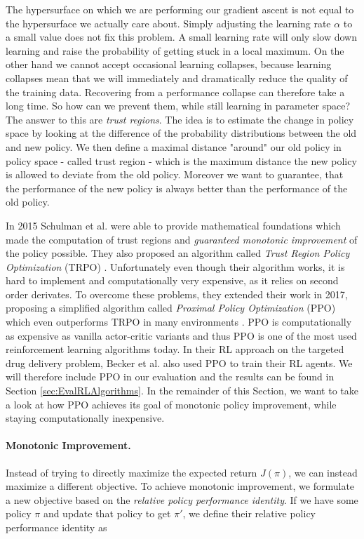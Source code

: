 The hypersurface on which we are performing our gradient ascent is not equal to the hypersurface we actually care about. Simply adjusting the learning rate $\alpha$ to a small value does not fix this problem. A small learning rate will only slow down learning and raise the probability of getting stuck in a local maximum. On the other hand we cannot accept occasional learning collapses, because learning collapses mean that we will immediately and dramatically reduce the quality of the training data. Recovering from a performance collapse can therefore take a long time. So how can we prevent them, while still learning in parameter space? The answer to this are \textit{trust regions}. The idea is to estimate the change in policy space by looking at the difference of the probability distributions between the old and new policy. We then define a maximal distance "around" our old policy in policy space - called trust region - which is the maximum distance the new policy is allowed to deviate from the old policy. Moreover we want to guarantee, that the performance of the new policy is always better than the performance of the old policy.

In 2015 Schulman et al. were able to provide mathematical foundations which made the computation of trust regions and \textit{guaranteed monotonic improvement} of the policy possible. They also proposed an algorithm called \textit{Trust Region Policy Optimization} (TRPO) \cite{schulman2015trust}. Unfortunately even though their algorithm works, it is hard to implement and computationally very expensive, as it relies on second order derivates. To overcome these problems, they extended their work in 2017, proposing a simplified algorithm called \textit{Proximal Policy Optimization} (PPO) which even outperforms TRPO in many environments \cite{schulman2017proximal}. PPO is computationally as expensive as vanilla actor-critic variants and thus PPO is one of the most used reinforcement learning algorithms today. In their RL approach on the targeted drug delivery problem, Becker et al. also used PPO to train their RL agents. We will therefore include PPO in our evaluation and the results can be found in Section \ref{sec:EvalRLAlgorithms}. In the remainder of this Section, we want to take a look at how PPO achieves its goal of monotonic policy improvement, while staying computationally inexpensive.

\paragraph{Monotonic Improvement.}
Instead of trying to directly maximize the expected return $J(\pi)$, we can instead maximize a different objective. To achieve monotonic improvement, we formulate a new objective based on the \textit{relative policy performance identity}. If we have some policy $\pi$ and update that policy to get $\pi'$, we define their relative policy performance identity as

